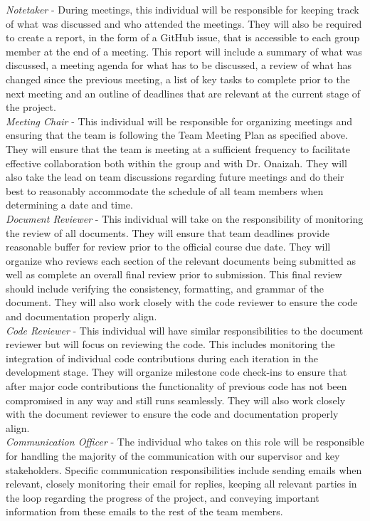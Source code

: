 \documentclass{article}
\begin{document}
\textit{Notetaker} - During meetings, this individual will be responsible for keeping track of what was discussed
and who attended the meetings. They will also be required to create a report, in the form of a GitHub issue, that is accessible to each group member
at the end of a meeting. This report will include a summary of what was discussed, a meeting agenda for what has to
be discussed, a review of what has changed since the previous meeting, a list of key tasks to complete prior to the
next meeting and an outline of deadlines that are relevant at the current stage of the project.\\

\textit{Meeting Chair} - This individual will be responsible for organizing meetings and ensuring that the team is
following the Team Meeting Plan as specified above. They will ensure that the team is meeting at a sufficient
frequency to facilitate effective collaboration both within the group and with Dr. Onaizah. They will also take
the lead on team discussions regarding future meetings and do their best to reasonably accommodate the schedule of
all team members when determining a date and time.\\

\textit{Document Reviewer} - This individual will take on the responsibility of monitoring the review of all
documents. They will ensure that team deadlines provide reasonable buffer for review prior to the official course
due date. They will organize who reviews each section of the relevant documents being submitted as well as complete
an overall final review prior to submission. This final review should include verifying the consistency,
formatting, and grammar of the document. They will also work closely with the code reviewer to ensure the code and
documentation properly align.\\

\textit{Code Reviewer} - This individual will have similar responsibilities to the document reviewer but will focus
on reviewing the code. This includes monitoring the integration of individual code contributions during each
iteration in the development stage. They will organize milestone code check-ins to ensure that after major code
contributions the functionality of previous code has not been compromised in any way and still runs seamlessly. They
will also work closely with the document reviewer to ensure the code and documentation properly align.\\

\textit{Communication Officer} - The individual who takes on this role will be responsible for handling the majority
of the communication with our supervisor and key stakeholders. Specific communication responsibilities include
sending emails when relevant, closely monitoring their email for replies, keeping all relevant parties in the loop
regarding the progress of the project, and conveying important information from these emails to the rest of the team
members.
\end{document}
